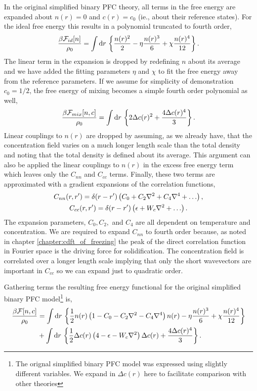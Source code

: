 In the original simplified binary PFC theory, all terms in the free energy are
expanded about $n(r) = 0$ and $c(r) = c_0$ (ie., about their reference states).
For the ideal free energy this results in a polynomial truncated to fourth
order,
%
\begin{equation}
    \label{ideal_expansion}
    \frac{\beta\mathcal{F}_{id}[n]}{\rho_0} = \int \mathrm{d}r\,
    \left\lbrace \frac{n(r)^2}{2} - \eta\frac{n(r)^3}{6} + \chi\frac{n(r)^4}{12} \right\rbrace.
\end{equation}
%
The linear term in the expansion is dropped by redefining $n$ about its average
and we have added the fitting parameters $\eta$ and $\chi$ to fit the free
energy away from the reference parameters. If we assume for simplicity of
demonstration $c_0 = 1/2$, the free energy of mixing becomes a simple fourth
order polynomial as well,
%
\begin{equation}
    \frac{\beta\mathcal{F}_{mix}[n, c]}{\rho_0} = \int \mathrm{d}r\, \left\lbrace
       2\Delta c(r)^2 + \frac{4\Delta c(r)^4}{3}
    \right\rbrace.
\end{equation}
%
Linear couplings to $n(r)$ are dropped by assuming, as we already have, that
the concentration field varies on a much longer length scale than the total
density and noting that the total density is defined about its average. This
argument can also be applied the linear couplings to $n(r)$ in the excess free
energy term which leaves only the $C_{nn}$ and $C_{cc}$ terms. Finally, these
two terms are approximated with a gradient expansions of the correlation
functions,
%
\begin{gather}
    C_{nn}(r, r^\prime) = \d(r - r^\prime)\l(
        C_0 + C_2 \nabla^2 + C_4 \nabla^4 + \dots\r), \\
    C_{cc}(r, r^\prime) = \d(r - r^\prime)\l(
        \epsilon + W_c \nabla^2 + \dots\r).
\end{gather}
%
The expansion parameters, $C_0, C_2,$ and $C_4$ are all dependent on
temperature and concentration. We are required to expand $C_{nn}$ to fourth
order because, as noted in chapter \ref{chapter:cdft_of_freezing} the peak of
the direct correlation function in Fourier space is the driving force for
solidification.  The concentration field is correlated over a longer length
scale implying that only the short wavevectors are important in $C_{cc}$ so we
can expand just to quadratic order.

Gathering terms the resulting free energy functional for the original simplified
binary PFC model\footnote{The orignal simplified binary PFC model was
expressed using slightly different variables. We expand in $\Delta c(r)$ here to 
facilitate comparison with other theories} is,
%
\begin{align}
    \frac{\beta\mathcal{F}[n, c]}{\rho_0} &= \int \mathrm{d}r\, \left\lbrace 
        \frac{1}{2} n(r) \left( 1 - C_0 - C_2 \nabla^2 - C_4\nabla^4 \right) n(r)
      - \eta\frac{n(r)^3}{6} + \chi\frac{n(r)^4}{12} \right\rbrace \\
    &+ \int \mathrm{d}r\, \left\lbrace
        \frac{1}{2} \Delta c(r) \left( 4 - \epsilon - W_c\nabla^2 \right) \Delta c(r) 
      + \frac{4 \Delta c(r)^4}{3} \right\rbrace. \nonumber
\end{align}
%

